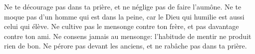 Ne te décourage pas dans ta prière, et ne néglige pas de faire l’aumône.
Ne te moque pas d’un homme qui est dans la peine,
	car le Dieu qui humilie est aussi celui qui élève.
Ne cultive pas le mensonge contre ton frère, et pas davantage contre ton ami.
Ne consens jamais au mensonge:
	l’habitude de mentir ne produit rien de bon.
Ne pérore pas devant les anciens, et ne rabâche pas dans ta prière.
